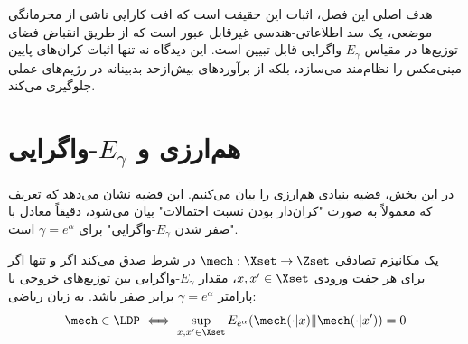 هدف اصلی این فصل، اثبات این حقیقت است که افت کارایی ناشی از محرمانگی موضعی، یک سد اطلاعاتی-هندسی غیرقابل عبور است که از طریق انقباض فضای توزیع‌ها در مقیاس $E_\gamma$-واگرایی قابل تبیین است. این دیدگاه نه تنها اثبات کران‌های پایین مینی‌مکس را نظام‌مند می‌سازد، بلکه از برآوردهای بیش‌از‌حد بدبینانه در رژیم‌های عملی جلوگیری می‌کند.



\section{هم‌ارزی  و $E_\gamma$-واگرایی}
\label{sec:egamma:equivalence}

در این بخش، قضیه بنیادی هم‌ارزی را بیان می‌کنیم. این قضیه نشان می‌دهد که تعریف  که معمولاً به صورت "کران‌دار بودن نسبت احتمالات" بیان می‌شود، دقیقاً معادل با "صفر شدن $E_\gamma$-واگرایی" برای $\gamma = e^\alpha$ است.

\begin{قضیه}
\label{eq:integral_rep_sason}
یک مکانیزم تصادفی $\mech: \Xset \to \Zset$ در شرط  صدق می‌کند اگر و تنها اگر برای هر جفت ورودی $x, x' \in \Xset$، مقدار $E_\gamma$-واگرایی بین توزیع‌های خروجی با پارامتر $\gamma = e^\alpha$ برابر صفر باشد. به زبان ریاضی:
\begin{equation}
\mech \in \text{\LDP} \iff \sup_{x, x' \in \Xset} E_{e^\alpha}(\mech(\cdot|x) \| \mech(\cdot|x')) = 0
\end{equation}
\end{قضیه}

